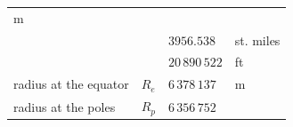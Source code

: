 \documentclass[
]{book}
\begin{document}
\begin{longtable}[]{@{}llll@{}}
\begin{minipage}[t]{0.05\columnwidth}
m\strut
\end{minipage}\tabularnewline
\begin{minipage}[t]{0.34\columnwidth}\raggedright
\strut
\end{minipage} & \begin{minipage}[t]{0.06\columnwidth}\raggedright
\strut
\end{minipage} & \begin{minipage}[t]{0.44\columnwidth}\raggedright
\(3956.538\)\strut
\end{minipage} & \begin{minipage}[t]{0.05\columnwidth}\raggedright
st. miles\strut
\end{minipage}\tabularnewline
\begin{minipage}[t]{0.34\columnwidth}\raggedright
\strut
\end{minipage} & \begin{minipage}[t]{0.06\columnwidth}\raggedright
\strut
\end{minipage} & \begin{minipage}[t]{0.44\columnwidth}\raggedright
\(20\,890\,522\)\strut
\end{minipage} & \begin{minipage}[t]{0.05\columnwidth}\raggedright
ft\strut
\end{minipage}\tabularnewline
\begin{minipage}[t]{0.34\columnwidth}\raggedright
radius at the equator\strut
\end{minipage} & \begin{minipage}[t]{0.06\columnwidth}\raggedright
\(R_e\)\strut
\end{minipage} & \begin{minipage}[t]{0.44\columnwidth}\raggedright
\(6\,378\,137\)\strut
\end{minipage} & \begin{minipage}[t]{0.05\columnwidth}\raggedright
m\strut
\end{minipage}\tabularnewline
\begin{minipage}[t]{0.34\columnwidth}\raggedright
radius at the poles\strut
\end{minipage} & \begin{minipage}[t]{0.06\columnwidth}\raggedright
\(R_p\)\strut
\end{minipage} & \begin{minipage}[t]{0.44\columnwidth}\raggedright
\(6\,356\,752\)\strut
\end{minipage} & \begin{minipage}[t]{0.05\columnwidth}\raggedright

\end{minipage}
\end{longtable}
\end{document}
